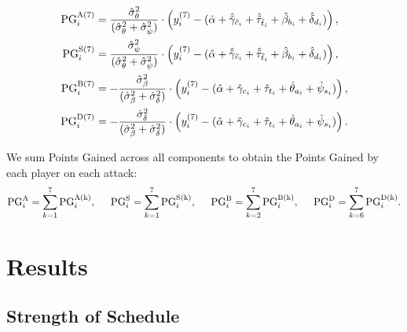\documentclass{article}
\begin{document}
\begin{align}
    \label{eqn:pg-attack-7}
    \begin{split}
        \mbox{PG}_i^{\mbox{\scriptsize A(7)}} &= \frac{\hat\sigma^2_\theta}{(\hat\sigma^2_\theta + \hat\sigma^2_\psi)} \cdot \left(y_i^{(7)} - (\hat\alpha + \hat{\tilde\gamma}_{\tilde c_i} + \hat{\tilde\tau}_{\tilde t_i} + \hat\beta_{b_i} + \hat\delta_{d_i})\right),\\
        \mbox{PG}_i^{\mbox{\scriptsize S(7)}} &= \frac{\hat\sigma^2_\psi}{(\hat\sigma^2_\theta + \hat\sigma^2_\psi)} \cdot \left(y_i^{(7)} - (\hat\alpha + \hat{\tilde\gamma}_{\tilde c_i} + \hat{\tilde\tau}_{\tilde t_i} + \hat\beta_{b_i} + \hat\delta_{d_i})\right),\\
        \mbox{PG}_i^{\mbox{\scriptsize B(7)}} &= -\frac{\hat\sigma^2_\beta}{(\hat\sigma^2_\beta + \hat\sigma^2_\delta)} \cdot \left(y_i^{(7)} - (\hat\alpha + \hat\gamma_{c_i} + \hat\tau_{t_i} + \hat\theta_{a_i} + \hat\psi_{s_i})\right),\\
        \mbox{PG}_i^{\mbox{\scriptsize D(7)}} &= -\frac{\hat\sigma^2_\delta}{(\hat\sigma^2_\beta + \hat\sigma^2_\delta)} \cdot \left(y_i^{(7)} - (\hat\alpha + \hat\gamma_{c_i} + \hat\tau_{t_i} + \hat\theta_{a_i} + \hat\psi_{s_i})\right).
    \end{split}
\end{align}

We sum Points Gained across all components to obtain the Points Gained by each player on each attack:
\begin{equation}
    \label{eqn:pg-attack}
    \mbox{PG}_i^{\mbox{\scriptsize A}} = \sum_{k = 1}^7\mbox{PG}_i^{\mbox{\scriptsize A(k)}}, \hspace{5mm}
    \mbox{PG}_i^{\mbox{\scriptsize S}} = \sum_{k = 1}^7\mbox{PG}_i^{\mbox{\scriptsize S(k)}}, \hspace{5mm}
    \mbox{PG}_i^{\mbox{\scriptsize B}} = \sum_{k = 2}^7\mbox{PG}_i^{\mbox{\scriptsize B(k)}}, \hspace{5mm}
    \mbox{PG}_i^{\mbox{\scriptsize D}} = \sum_{k = 6}^7\mbox{PG}_i^{\mbox{\scriptsize D(k)}}.
\end{equation}

\section{Results}

\subsection{Strength of Schedule}
\end{document}
